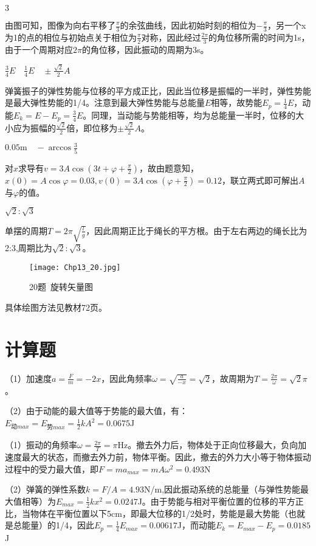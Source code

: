 \exercise $3$

\solve
由图可知，图像为向右平移了$\frac{\pi}{3}$的余弦曲线，因此初始时刻的相位为$-\frac{\pi}{3}$，另一个x为1的点的相位与初始点关于相位为$\frac{\pi}{2}$对称，因此经过$\frac{2\pi}{3}$的角位移所需的时间为1s，由于一个周期对应$2\pi$的角位移，因此振动的周期为3s。

\exercise $\frac{3}{4}E \quad \frac{1}{4}E \quad \pm\frac{\sqrt{2}}{2}A$

\solve
弹簧振子的弹性势能与位移的平方成正比，因此当位移是振幅的一半时，弹性势能是最大弹性势能的1/4。注意到最大弹性势能与总能量$E$相等，故势能$E_p=\frac{1}{4}E$，动能$E_k=E-E_p=\frac{3}{4}E$。同理，当动能与势能相等，均为总能量一半时，位移的大小应为振幅的$\frac{\sqrt{2}}{2}$倍，即位移为$\pm\frac{\sqrt{2}}{2}A$。

\exercise $0.05\mathrm{m}\quad -\arccos{\frac{3}{5}}$

\solve
对$x$求导有$v=3A\cos(3t+\varphi+\frac{\pi}{2})$，故由题意知，$x(0)=A\cos\varphi=0.03,v(0)=3A\cos(\varphi+\frac{\pi}{2})=0.12$，联立两式即可解出$A$与$\varphi$的值。

\exercise $\sqrt{2}:\sqrt{3}$

\solve
单摆的周期$T=2\pi\sqrt{\frac{l}{g}}$，因此周期正比于绳长的平方根。由于左右两边的绳长比为2:3,周期比为$\sqrt{2}:\sqrt{3}$。

\exercise

\solve
\begin{figure}[htb]
\centering
\texttt{[image: Chp13\_20.jpg]}
\caption{20题\ 旋转矢量图}
\end{figure}
具体绘图方法见教材72页。

\section{计算题}
\exercise

\solve
（1）加速度$a=\frac{F}{m}=-2x$，因此角频率$\omega=\sqrt{\frac{a}{-x}}=\sqrt{2}$，故周期为$T=\frac{2\pi}{\omega}=\sqrt{2}\pi$。

（2）由于动能的最大值等于势能的最大值，有：$E_{\text{动}max}=E_{\text{势}max}=\frac{1}{2}kA^2=0.0675$J

\exercise

\solve
（1）振动的角频率$\omega=\frac{2\pi}{T}=\pi$Hz。撤去外力后，物体处于正向位移最大，负向加速度最大的状态，而撤去外力前，物体平衡。因此，撤去的外力大小等于物体振动过程中的受力最大值，即$F=ma_{max}=mA\omega^2=0.493$N

（2）弹簧的弹性系数$k=F/A=4.93$N/m,因此振动系统的总能量（与弹性势能最大值相等）为$E_{max}=\frac{1}{2}kx^2=0.0247$J。由于势能与相对平衡位置的位移的平方正比，当物体在平衡位置以下5cm，即最大位移的1/2处时，势能是最大势能（也就是总能量）的1/4，因此$E_p=\frac{1}{4}E_{max}=0.00617$J，而动能$E_ k=E_{max}-E_ p=0.0185$J

